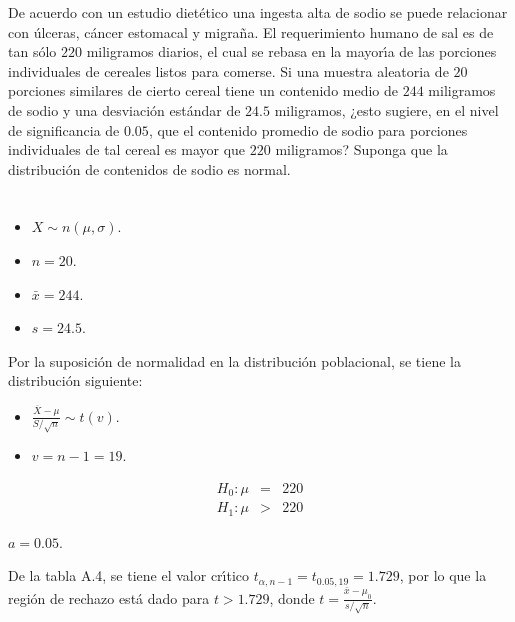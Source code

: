 \begin{enunciado}
 De acuerdo con un estudio diet\'etico una ingesta alta de sodio se puede relacionar con \'ulceras, c\'ancer estomacal y migra\~na. El requerimiento humano de sal es de tan s\'olo $220$ miligramos diarios, el cual se rebasa en la mayor\'{\i}a de las porciones individuales de cereales listos para comerse. Si una muestra aleatoria de $20$ porciones similares de cierto cereal tiene un contenido medio de $244$ miligramos de sodio y una desviaci\'on est\'andar de $24.5$ miligramos, ¿esto sugiere, en el nivel de significancia de $0.05$, que el contenido promedio de sodio para porciones individuales de tal cereal es mayor que $220$ miligramos? Suponga que la distribuci\'on de contenidos de sodio es normal.
\end{enunciado}

\begin{solucion}
 \begin{datos}
  $\phantom{0}$
  \begin{itemize}
   \item $X \sim n(\mu, \sigma)$.
   \item $n = 20$.
   \item $\bar{x} = 244$.
   \item $s = 24.5$.
  \end{itemize}
  Por la suposici\'on de normalidad en la distribuci\'on
  poblacional, se tiene la distribuci\'on siguiente:
  \begin{itemize}
   \item $\displaystyle{\frac{\overline{X} - \mu}{S/\sqrt{n}}  \sim t(v) }$.
   \item $v = n-1 = 19$.
  \end{itemize}
 \end{datos}

 \begin{hipotesis}
  \begin{eqnarray*}
   H_0: \mu & = & 220 \\
   H_1: \mu & > & 220
  \end{eqnarray*}
 \end{hipotesis}

 \begin{significancia}
  $a = 0.05$.
 \end{significancia}

 \begin{region}
  De la tabla A.4, se tiene el valor cr\'{\i}tico $t_{\alpha,n-1} = t_{0.05,19} = 1.729$, por lo que la regi\'on de rechazo est\'a dado para $t > 1.729$, donde $t = \frac{\bar{x} - \mu_0}{s/\sqrt{n}}$.
 \end{region}


\end{solucion}
